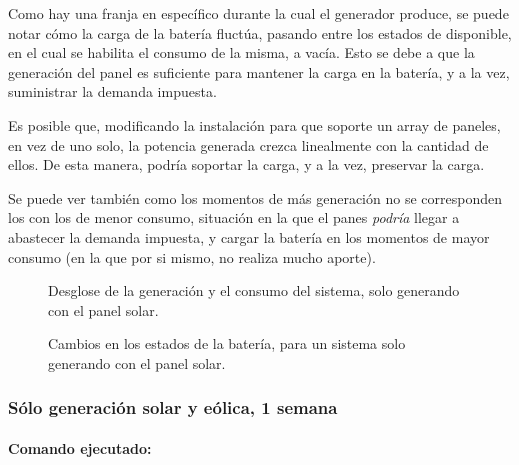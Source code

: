 Como hay una franja en específico durante la cual el generador produce,
se puede notar cómo la carga de la batería fluctúa, pasando entre los
estados de disponible, en el cual se habilita el consumo de la misma, a
vacía. Esto se debe a que la generación del panel es suficiente para
mantener la carga en la batería, y a la vez, suministrar la demanda
impuesta.

Es posible que, modificando la instalación para que soporte un array de
paneles, en vez de uno solo, la potencia generada crezca linealmente con
la cantidad de ellos. De esta manera, podría soportar la carga, y a la
vez, preservar la carga.

Se puede ver también como los momentos de más generación no se
corresponden los con los de menor consumo, situación en la que el panes
\emph{podría} llegar a abastecer la demanda impuesta, y cargar la
batería en los momentos de mayor consumo (en la que por si mismo, no
realiza mucho aporte).

\begin{figure}
    \begin{center}
    \end{center}
    \caption{Desglose de la generación y el consumo del sistema, solo generando con el panel solar.}\label{fig:simu1:1}
\end{figure}
    
\begin{figure}
    \begin{center}
    \end{center}
    \caption{Cambios en los estados de la batería, para un sistema solo generando con el panel solar.}\label{fig:simu1:2}
\end{figure}
    
    \hypertarget{suxf3lo-generaciuxf3n-solar-y-euxf3lica-1-semana}{%
\subsubsection{Sólo generación solar y eólica, 1
semana}\label{suxf3lo-generaciuxf3n-solar-y-euxf3lica-1-semana}}

\hypertarget{comando-ejecutado}{%
\paragraph{Comando ejecutado:}\label{comando-ejecutado}}

